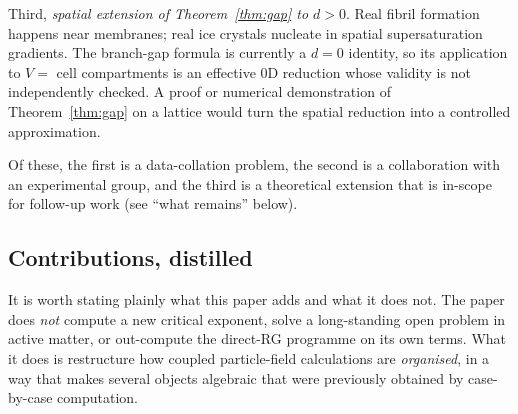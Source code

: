\documentclass[11pt,a4paper]{article}
\theoremstyle{plain}
\begin{document}
Third, \emph{spatial extension of Theorem~\ref{thm:gap} to $d > 0$}.
Real fibril formation happens near membranes; real ice crystals
nucleate in spatial supersaturation gradients.  The branch-gap
formula is currently a $d = 0$ identity, so its application to
$V = $ cell compartments is an effective 0D reduction whose
validity is not independently checked.  A proof or numerical
demonstration of Theorem~\ref{thm:gap} on a lattice would turn
the spatial reduction into a controlled approximation.

Of these, the first is a data-collation problem, the second is a
collaboration with an experimental group, and the third is a
theoretical extension that is in-scope for follow-up work (see
``what remains'' below).

\subsection{Contributions, distilled}
\label{sec:contributions}

It is worth stating plainly what this paper adds and what it does
not.  The paper does \emph{not} compute a new critical exponent,
solve a long-standing open problem in active matter, or
out-compute the direct-RG programme on its own terms.  What it
does is restructure how coupled particle-field calculations are
\emph{organised}, in a way that makes several objects algebraic
that were previously obtained by case-by-case computation.
\end{document}
